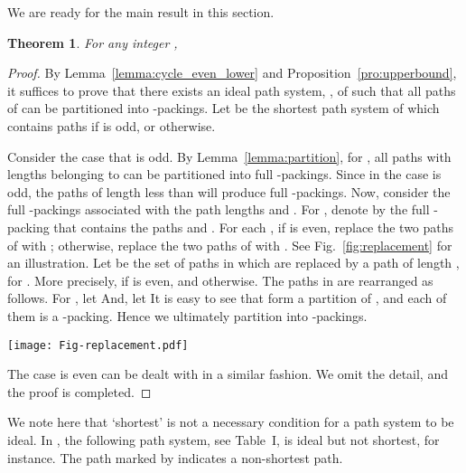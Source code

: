 \documentclass[journal,draftcls,onecolumn,12pt,twoside]{IEEEtran}
\newtheorem{theorem}{\bf Theorem}
\begin{document}
We are ready for the main result in this section.

\begin{theorem}\label{thm:cycle_even}
For any integer , 
\end{theorem}
\begin{proof}
By Lemma~\ref{lemma:cycle_even_lower} and Proposition~\ref{pro:upperbound}, it suffices to prove that there exists an ideal path system, , of  such that all paths of  can be partitioned into  -packings.
Let  be the shortest path system of  which contains paths  if  is odd, or  otherwise.

Consider the case that  is odd.
By Lemma~\ref{lemma:partition}, for , all paths with lengths belonging to  can be partitioned into  full -packings.
Since  in the case  is odd, the paths of length less than  will produce  full -packings.
Now, consider the  full -packings associated with the path lengths  and .
For , denote by  the full -packing that contains the paths  and .
For each , if  is even, replace the two paths  of  with ; otherwise, replace the two paths  of  with .
See Fig.~\ref{fig:replacement} for an illustration.
Let  be the set of paths in  which are replaced by a path of length , for .
More precisely,  if  is even, and  otherwise.
The paths in  are rearranged as follows.
For , let  
And, let 
It is easy to see that  form a partition of , and each of them is a -packing.
Hence we ultimately partition  into  -packings.

\begin{figure*}\centering
\texttt{[image: Fig-replacement.pdf]}
\caption{Replace some paths of  with a path of length .} \label{fig:replacement}
\end{figure*}

The case  is even can be dealt with in a similar fashion.
We omit the detail, and the proof is completed.
\end{proof}

We note here that `shortest' is not a necessary condition for a path system to be ideal.
In , the following path system, see Table~I, is ideal but not shortest, for instance.
The path marked by  indicates a non-shortest path.
\end{document}
